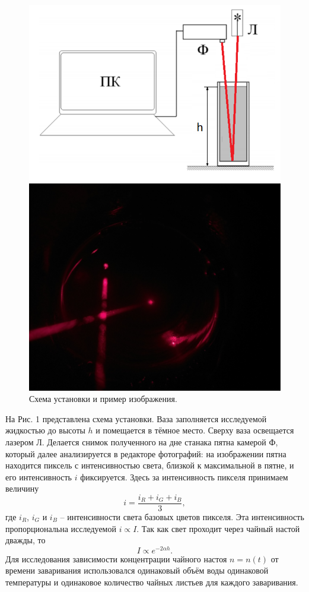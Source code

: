 \documentclass[a4paper,12pt]{article}
\begin{document}
\begin{figure}[h]
\begin{minipage}[h]{0.6\linewidth}
\includegraphics[scale=0.6]{1.png}
\centering
\end{minipage}
\hfill
\begin{minipage}[h]{0.4\linewidth}
\includegraphics[scale=0.09]{4.png}
\end{minipage}
\caption{Схема установки и пример изображения.}
\end{figure}

На Рис. 1 представлена схема установки. Ваза заполняется исследуемой жидкостью до высоты $h$ и помещается в тёмное место. Сверху ваза освещается лазером Л. Делается снимок полученного на дне станака пятна камерой Ф, который далее анализируется в редакторе фотографий: на изображении пятна находится пиксель с интенсивностью света, близкой к максимальной в пятне, и его интенсивность $i$ фиксируется. Здесь за интенсивность пикселя принимаем величину
$$
i = \dfrac{i_R + i_G + i_B}{3},
$$
где $i_R$, $i_G$ и $i_B$ -- интенсивности света базовых цветов пикселя. Эта интенсивность пропорциональна исследуемой $i \propto I$. Так как свет проходит через чайный настой дважды, то
$$
I \propto e^{-2\alpha h}.
$$
Для исследования зависимости концентрации чайного настоя $n = n(t)$ от времени заваривания использовался одинаковый объём воды одинаковой температуры и одинаковое количество чайных листьев для каждого заваривания.
\end{document}
